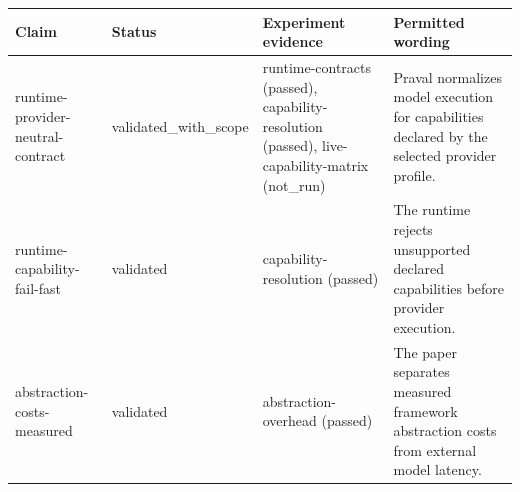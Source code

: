 \begin{tabular}{llll}
\hline
Claim & Status & Experiment evidence & Permitted wording \\
\hline
runtime-provider-neutral-contract & validated\_with\_scope & runtime-contracts (passed), capability-resolution (passed), live-capability-matrix (not\_run) & Praval normalizes model execution for capabilities declared by the selected provider profile. \\
runtime-capability-fail-fast & validated & capability-resolution (passed) & The runtime rejects unsupported declared capabilities before provider execution. \\
abstraction-costs-measured & validated & abstraction-overhead (passed) & The paper separates measured framework abstraction costs from external model latency. \\
\hline
\end{tabular}
